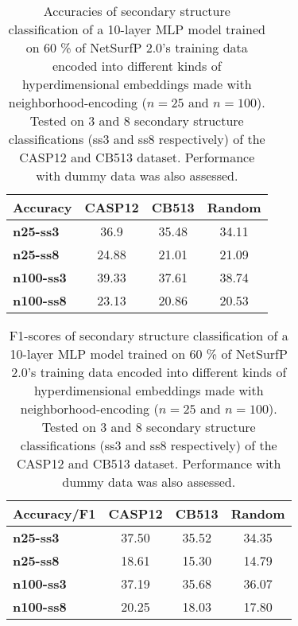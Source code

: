 \begin{table}[h]
    \caption{Accuracies of secondary structure classification of a 10-layer MLP model trained on 60 \% of NetSurfP 2.0's training data encoded into different kinds of hyperdimensional embeddings made with neighborhood-encoding ($n = 25$ and $n=100$). Tested on 3 and 8 secondary structure classifications (ss3 and ss8 respectively) of the CASP12 and CB513 dataset. Performance with dummy data was also assessed.}
    \label{tab:casp}
    \centering
    \begin{tabular}{lccc}
        \toprule
        \textbf{Accuracy} & CASP12 & CB513 & Random\\
        \midrule
        \textbf{n25-ss3} & 36.9 & 35.48 & 34.11\\
        \textbf{n25-ss8} & 24.88 & 21.01& 21.09\\
        \textbf{n100-ss3} & 39.33 & 37.61 & 38.74\\
        \textbf{n100-ss8} & 23.13 & 20.86 & 20.53\\
        \bottomrule
    \end{tabular}
  \end{table}

  \begin{table}[h]
    \caption{F1-scores of secondary structure classification of a 10-layer MLP model trained on 60 \% of NetSurfP 2.0's training data encoded into different kinds of hyperdimensional embeddings made with neighborhood-encoding ($n = 25$ and $n=100$). Tested on 3 and 8 secondary structure classifications (ss3 and ss8 respectively) of the CASP12 and CB513 dataset. Performance with dummy data was also assessed.}
    \label{tab:casp2}
    \centering
    \begin{tabular}{lccc}
        \toprule
        \textbf{Accuracy/F1} & CASP12 & CB513 & Random\\
        \midrule
        \textbf{n25-ss3} & 37.50 & 35.52 & 34.35\\
        \textbf{n25-ss8} & 18.61 & 15.30 & 14.79\\
        \textbf{n100-ss3} & 37.19 & 35.68 & 36.07\\
        \textbf{n100-ss8} & 20.25 & 18.03 & 17.80\\
        \bottomrule
    \end{tabular}
  \end{table}